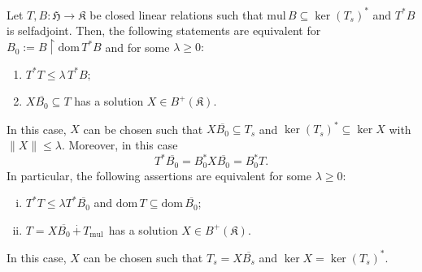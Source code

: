 \documentclass[10pt,a4paper]{amsart}
\newcommand{\D}{\mathrm{dom}\,}
\newcommand{\DT}{\mathrm{dom}\,T }
\newcommand{\adj}{^*}
\newcommand{\h}{\mathfrak{H}}
\newcommand{\inclu}{\subseteq}
\newcommand{\kk}{\mathfrak{K}}
\renewcommand{\labelenumi}{(\arabic{enumi})}
\newcommand{\lplusk}{B^{+}(\kk)}
\newcommand{\mul}{\mathrm{mul} \, }
\newcommand{\n}{\|}
\newcommand{\rest}{\upharpoonright}
\newcommand{\ts}{T_s}
\newcommand{\tstar}{T^{*}}
\begin{document}
\begin{theorem}\label{relationtheo}
  Let $T, B: \h\rightarrow \kk$ be closed linear relations such that
$\mul B \subseteq \ker (\ts)\adj$ and   $\tstar B $ is selfadjoint.
Then, the following statements are equivalent  for $B_0:= B \rest \D \tstar B$ and for  some $\lambda \geq  0:$
 \begin{enumerate}\def\labelenumi{\rm(\roman{enumi})}
     \item $T^* T  \leq \lambda \, \tstar B ;$
     \item $  X \overline{B_0}\inclu T   $ has a solution $X \in \lplusk.$
          \end{enumerate}
 In this case, $X$ can be chosen such that $X\overline{B_0}  \inclu T_s$ and $ \ker (\ts)\adj \inclu \ker X$ with $\n X \n \leq \lambda.$ Moreover, in this case
      \begin{equation}\label{hawnha}
        \tstar \overline{B_0} =  B_0 \adj X \overline{B_0}= B_0\adj T.
      \end{equation}
 In particular, the following assertions are equivalent for some $\lambda \geq 0:$
   \begin{enumerate}[i)]\def\labelenumi{\rm(\roman{enumi})}\setcounter{enumi}{2}
     \item $T^* T  \leq \lambda \tstar \overline{B_0}$ and $\DT  \inclu \D \overline{B_0}$;
     \item $T=X\overline{B_0}\,\overset{.}{+}\, T_{\mul}$ has a solution $X \in \lplusk.$
      \end{enumerate}
      In this case, $X$ can be chosen such that $T_s=X\overline{B_s}$ and $\ker X =\ker (\ts)\adj.$
\end{theorem}
\end{document}
